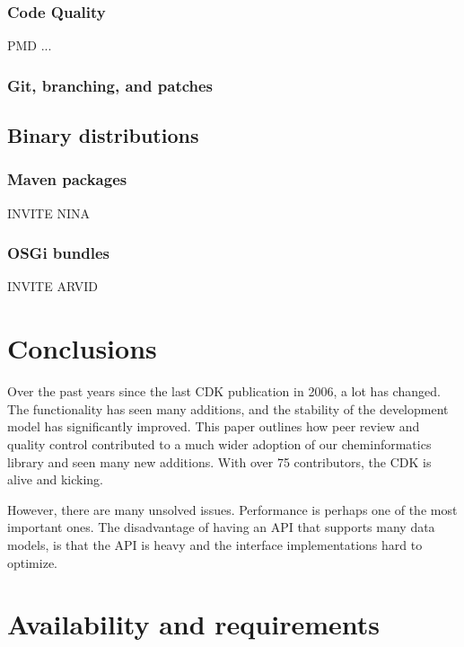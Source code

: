 \documentclass[10pt]{bmc_article}
\newenvironment{bmcformat}{\begin{raggedright}\baselineskip20pt\sloppy\setboolean{publ}{false}}{\end{raggedright}\baselineskip20pt\sloppy}
\begin{document}
\begin{bmcformat}
  \subsubsection*{Code Quality}

  PMD ...

  \subsubsection*{Git, branching, and patches}
  
\subsection*{Binary distributions}

\subsubsection*{Maven packages}

INVITE NINA

\subsubsection*{OSGi bundles}

INVITE ARVID


\section*{Conclusions}

Over the past years since the last CDK publication in 2006, a lot has changed. The functionality
has seen many additions, and the stability of the development model has significantly improved.
This paper outlines how peer review and quality control contributed to a much wider adoption
of our cheminformatics library and seen many new additions. With over 75 contributors,
the CDK is alive and kicking.

However, there are many unsolved issues. Performance is perhaps one of the most important ones.
The disadvantage of having an API that supports many data models, is that the API is heavy and
the interface implementations hard to optimize.

\section*{Availability and requirements}


\end{bmcformat}
\end{document}
